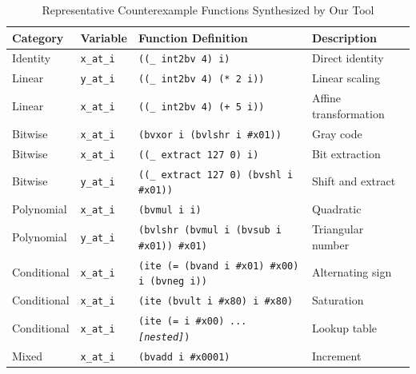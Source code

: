 \begin{table}[t]
\centering
\caption{Representative Counterexample Functions Synthesized by Our Tool}
\label{tab:ccex_functions}
\small
\begin{tabular}{@{}llp{5.5cm}l@{}}
\toprule
\textbf{Category} & \textbf{Variable} & \textbf{Function Definition} & \textbf{Description} \\
\midrule

Identity & \texttt{x\_at\_i} & 
\texttt{((\_ int2bv 4) i)} & 
Direct identity \\

Linear & \texttt{y\_at\_i} & 
\texttt{((\_ int2bv 4) (* 2 i))} & 
Linear scaling \\

Linear & \texttt{x\_at\_i} & 
\texttt{((\_ int2bv 4) (+ 5 i))} & 
Affine transformation \\

Bitwise & \texttt{x\_at\_i} & 
\texttt{(bvxor i (bvlshr i \#x01))} & 
Gray code \\

Bitwise & \texttt{x\_at\_i} & 
\texttt{((\_ extract 127 0) i)} & 
Bit extraction \\

Bitwise & \texttt{y\_at\_i} & 
\texttt{((\_ extract 127 0) (bvshl i \#x01))} & 
Shift and extract \\

Polynomial & \texttt{x\_at\_i} & 
\texttt{(bvmul i i)} & 
Quadratic \\

Polynomial & \texttt{y\_at\_i} & 
\texttt{(bvlshr (bvmul i (bvsub i \#x01)) \#x01)} & 
Triangular number \\

Conditional & \texttt{x\_at\_i} & 
\texttt{(ite (= (bvand i \#x01) \#x00) i (bvneg i))} & 
Alternating sign \\

Conditional & \texttt{x\_at\_i} & 
\texttt{(ite (bvult i \#x80) i \#x80)} & 
Saturation \\

Conditional & \texttt{x\_at\_i} & 
\texttt{(ite (= i \#x00) \textit{...} \textit{[nested]})} & 
Lookup table \\

Mixed & \texttt{x\_at\_i} & 
\texttt{(bvadd i \#x0001)} & 
Increment \\


\end{tabular}
\end{table}
